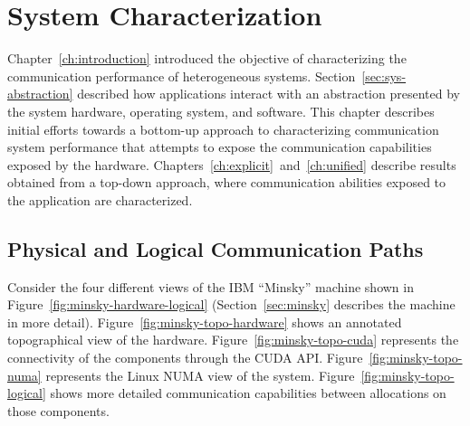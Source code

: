 \chapter{System Characterization}
\label{ch:sys-char}

Chapter~\ref{ch:introduction} introduced the objective of characterizing the communication performance of heterogeneous systems.
Section~\ref{sec:sys-abstraction} described how applications interact with an abstraction presented by the system hardware, operating system, and software.
This chapter describes initial efforts towards a bottom-up approach to characterizing communication system performance that attempts to expose the communication capabilities exposed by the hardware.
Chapters~\ref{ch:explicit}~and~\ref{ch:unified} describe results obtained from a top-down approach, where communication abilities exposed to the application are characterized.

\section{Physical and Logical Communication Paths}

Consider the four different views of the IBM ``Minsky'' machine shown in Figure~\ref{fig:minsky-hardware-logical} (Section~\ref{sec:minsky} describes the machine in more detail).
Figure~\ref{fig:minsky-topo-hardware} shows an annotated topographical view of the hardware.
Figure~\ref{fig:minsky-topo-cuda} represents the connectivity of the components through the CUDA API.
Figure~\ref{fig:minsky-topo-numa} represents the Linux NUMA view of the system.
Figure~\ref{fig:minsky-topo-logical} shows more detailed communication capabilities between allocations on those components.

